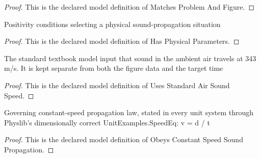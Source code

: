 \begin{proof}
  This is the declared model definition of Matches Problem And Figure.
\end{proof}
\begin{definition}
  \label{def:physics:phyx-mini-0215:phyxminiproblems-problemphyxmini0215-hasphysicalparameters}
  Positivity conditions selecting a physical sound-propagation situation
\end{definition}
\begin{proof}
  This is the declared model definition of Has Physical Parameters.
\end{proof}
\begin{definition}
  \label{def:physics:phyx-mini-0215:phyxminiproblems-problemphyxmini0215-usesstandardairsoundspeed}
  The standard textbook model input that sound in the ambient air travels at 343 m/s. It is kept separate from both the figure data and the target time
\end{definition}
\begin{proof}
  This is the declared model definition of Uses Standard Air Sound Speed.
\end{proof}
\begin{definition}
  \label{def:physics:phyx-mini-0215:phyxminiproblems-problemphyxmini0215-obeysconstantspeedsoundpropagation}
  Governing constant-speed propagation law, stated in every unit system through Physlib's dimensionally correct UnitExamples.SpeedEq: v = d / t
\end{definition}
\begin{proof}
  This is the declared model definition of Obeys Constant Speed Sound Propagation.
\end{proof}
